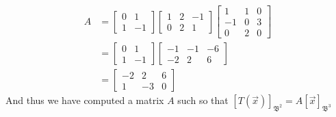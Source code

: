\documentclass{report}
\begin{document}
{$$\begin{aligned}
A & = \begin{bmatrix} 0&1\\1&-1 \end{bmatrix}\begin{bmatrix} 1&2&-1\\0&2&1 \end{bmatrix}\begin{bmatrix} 1&1&0\\-1&0&3\\0&2&0 \end{bmatrix} \\
& =\begin{bmatrix} 0&1\\1&-1 \end{bmatrix}\begin{bmatrix} -1&-1&-6\\-2&2&6 \end{bmatrix} \\
& = \begin{bmatrix} -2&2&6\\1&-3&0 \end{bmatrix}
\end{aligned}
$$
And thus we have computed a matrix $A$ such so that $[T(\vec{x})]_{\mathfrak{B}^2}=A[\vec{x}]_{\mathfrak{B}^3}$
}
\end{document}
